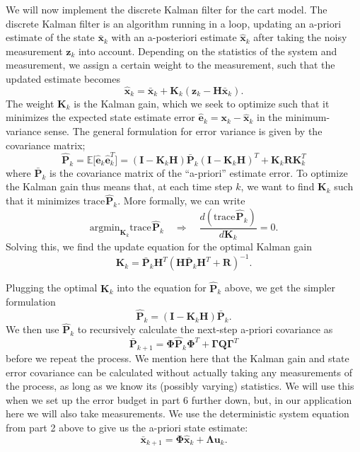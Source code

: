 \documentclass[11pt]{article}
\begin{document}
    We will now implement the discrete Kalman filter for the cart model. The
discrete Kalman filter is an algorithm running in a loop, updating an
a-priori estimate of the state \(\bar{\mathbf{x}}_k\) with an
a-posteriori estimate \(\hat{\mathbf{x}}_k\) after taking the noisy
measurement \(\mathbf{z}_k\) into account. Depending on the statistics
of the system and measurement, we assign a certain weight to the
measurement, such that the updated estimate becomes \[
\hat{\mathbf{x}}_k = \bar{\mathbf{x}}_k + \mathbf{K}_k (\mathbf{z}_k - \mathbf{H}\bar{\mathbf{x}}_k).
\] The weight \(\mathbf{K}_k\) is the Kalman gain, which we seek to
optimize such that it minimizes the expected state estimate error
\(\hat{\mathbf{e}}_k = \mathbf{x}_k - \hat{\mathbf{x}}_k\) in the
minimum-variance sense. The general formulation for error variance is
given by the covariance matrix; \[
\hat{\mathbf{P}}_k = \mathbb{E} \big[ \hat{\mathbf{e}}_k \hat{\mathbf{e}}_k^T \big] = (\mathbf{I} - \mathbf{K}_k \mathbf{H}) \bar{\mathbf{P}}_k (\mathbf{I} - \mathbf{K}_k \mathbf{H})^T + \mathbf{K}_k \mathbf{R} \mathbf{K}_k^T
\] where \(\bar{\mathbf{P}}_k\) is the covariance matrix of the
``a-priori'' estimate error. To optimize the Kalman gain thus means
that, at each time step \(k\), we want to find \({\mathbf{K}_k}\) such
that it minimizes \(\mathrm{trace} \hspace{1pt} \hat{\mathbf{P}}_k\).
More formally, we can write \[
\mathrm{argmin}_{\mathbf{K}_k} \mathrm{trace} \hspace{1pt} \hat{\mathbf{P}}_k
\quad \Rightarrow \quad \frac{d(\mathrm{trace} \hspace{1pt} \hat{\mathbf{P}}_k)}{d {\mathbf{K}_k}} = 0.
\] Solving this, we find the update equation for the optimal Kalman gain
\[ 
\mathbf{K}_k = \bar{\mathbf{P}}_k \mathbf{H}^T (\mathbf{H} \bar{\mathbf{P}}_k \mathbf{H}^T + \mathbf{R})^{-1}.
\]

Plugging the optimal \(\mathbf{K}_k\) into the equation for
\(\hat{\mathbf{P}}_k\) above, we get the simpler formulation \[
\hat{\mathbf{P}}_k = (\mathbf{I} - \mathbf{K}_k \mathbf{H}) \bar{\mathbf{P}}_k.
\] We then use \(\hat{\mathbf{P}}_k\) to recursively calculate the
next-step a-priori covariance as \[
\bar{\mathbf{P}}_{k+1} = \mathbf{\Phi} \hat{\mathbf{P}}_k \mathbf{\Phi}^T + \mathbf{\Gamma} \mathbf{Q} \mathbf{\Gamma}^T
\] before we repeat the process. We mention here that the Kalman gain
and state error covariance can be calculated without actually taking any
measurements of the process, as long as we know its (possibly varying)
statistics. We will use this when we set up the error budget in part 6
further down, but, in our application here we will also take
measurements. We use the deterministic system equation from part 2 above
to give us the a-priori state estimate: \[
\bar{\mathbf{x}}_{k+1} = \mathbf{\Phi} \hat{\mathbf{x}}_k + \mathbf{\Lambda} \mathbf{u}_k.
\]
\end{document}
